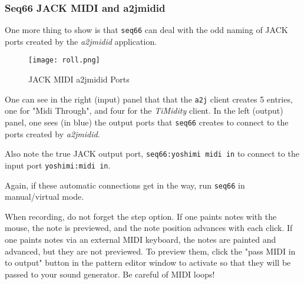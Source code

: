 \subsubsection{Seq66 JACK MIDI and a2jmidid}
\label{subsubsec:jack_midi_a2jmidid}

   One more thing to show is that \texttt{seq66} can deal with the odd naming
   of JACK ports created by the \textsl{a2jmidid} application.

\begin{figure}[H]
   \centering 
   \texttt{[image: roll.png]}
   \caption{JACK MIDI a2jmidid Ports}
   \label{fig:a2jmidid_jack_midi}
\end{figure}

   One can see in the right (input) panel that that the \texttt{a2j} client
   creates 5 entries, one for "Midi Through", and four for the
   \textsl{TiMidity} client.
   In the left (output) panel, one sees (in blue) the output
   ports that \texttt{seq66} creates to connect to the ports created by
   \textsl{a2jmidid}.

   Also note the true JACK output port,
   \texttt{seq66:yoshimi midi in} to connect to the input port
   \texttt{yoshimi:midi in}.

   Again, if these automatic connections get in the way, run \texttt{seq66} in
   manual/virtual mode.

   When recording, do not forget the step option.  If one paints notes with the
   mouse, the note is previewed, and the note position advances with each
   click.  If one paints notes via an external MIDI keyboard, the notes are
   painted and advanced, but they are not previewed.  To preview them, click
   the "pass MIDI in to output" button in the pattern editor window to activate
   so that they will be passed to your sound generator.
	Be careful of MIDI loops!

